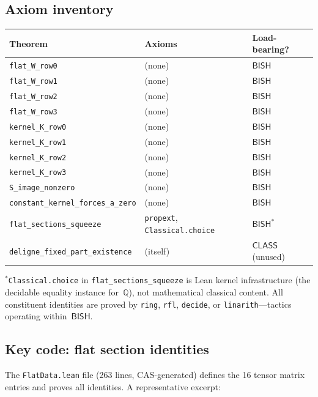 \documentclass[11pt]{article}
\theoremstyle{plain}
\theoremstyle{definition}
\theoremstyle{remark}
\newcommand{\Q}{\mathbb{Q}}
\newcommand{\BISH}{\mathsf{BISH}}
\newcommand{\CLASS}{\mathsf{CLASS}}
\begin{document}
\subsection{Axiom inventory}

\begin{center}
\begin{tabular}{lll}
\toprule
\textbf{Theorem} & \textbf{Axioms} & \textbf{Load-bearing?} \\
\midrule
\texttt{flat\_W\_row0} & (none) & $\BISH$ \\
\texttt{flat\_W\_row1} & (none) & $\BISH$ \\
\texttt{flat\_W\_row2} & (none) & $\BISH$ \\
\texttt{flat\_W\_row3} & (none) & $\BISH$ \\
\texttt{kernel\_K\_row0} & (none) & $\BISH$ \\
\texttt{kernel\_K\_row1} & (none) & $\BISH$ \\
\texttt{kernel\_K\_row2} & (none) & $\BISH$ \\
\texttt{kernel\_K\_row3} & (none) & $\BISH$ \\
\texttt{S\_image\_nonzero} & (none) & $\BISH$ \\
\texttt{constant\_kernel\_forces\_a\_zero} & (none) & $\BISH$ \\
\texttt{flat\_sections\_squeeze} & \texttt{propext}, \texttt{Classical.choice} & $\BISH^*$ \\
\texttt{deligne\_fixed\_part\_existence} & (itself) & $\CLASS$ (unused) \\
\bottomrule
\end{tabular}
\end{center}

\medskip\noindent
${}^*$\texttt{Classical.choice} in \texttt{flat\_sections\_squeeze}
is Lean kernel infrastructure (the decidable equality instance
for~$\Q$), not mathematical classical content.  All constituent
identities are proved by \texttt{ring}, \texttt{rfl},
\texttt{decide}, or \texttt{linarith}---tactics operating
within~$\BISH$.

\subsection{Key code: flat section identities}

The \texttt{FlatData.lean} file (263 lines, CAS-generated)
defines the 16 tensor matrix entries and proves all identities.
A representative excerpt:
\end{document}
